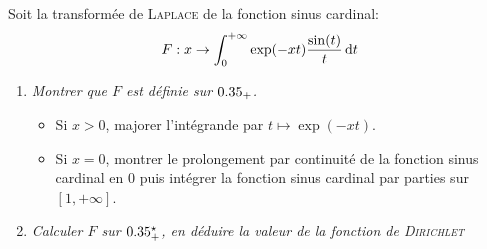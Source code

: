 Soit la transformée de \textsc{Laplace} de la fonction sinus cardinal:
$$F:x \to \int_{0}^{+ \infty} \exp(-xt) \frac{\sin (t)}{t} \, \mathrm{d} t$$
    
\begin{enumerate}
    \item \emph{Montrer que $F$ est définie sur $0.35_+$.}
    \begin{itemize}
        \item Si $x > 0$, majorer l'intégrande par $t \mapsto \exp(-xt)$.
        \item Si $x = 0$, montrer le prolongement par continuité de la fonction sinus cardinal en $0$ puis intégrer la fonction sinus cardinal par parties sur $[1, +\infty]$.
    \end{itemize}
    \item \emph{Calculer $F$ sur $0.35^\star_+$, en déduire la valeur de la fonction de \textsc{Dirichlet}}
\end{enumerate}

